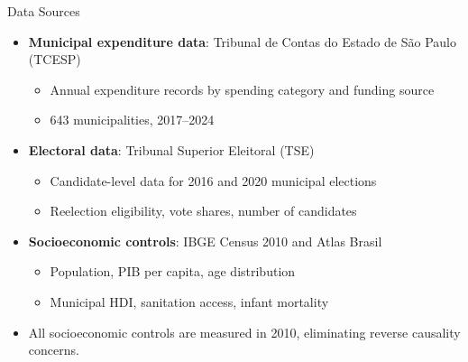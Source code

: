\documentclass{beamer}
\begin{document}
\begin{frame}{Data Sources}
\begin{itemize}
    \item \textbf{Municipal expenditure data}: Tribunal de Contas do Estado de São Paulo (TCESP)
    \begin{itemize}
        \item Annual expenditure records by spending category and funding source
        \item 643 municipalities, 2017--2024
    \end{itemize}
    \vspace{0.5em}
    \item \textbf{Electoral data}: Tribunal Superior Eleitoral (TSE)
    \begin{itemize}
        \item Candidate-level data for 2016 and 2020 municipal elections
        \item Reelection eligibility, vote shares, number of candidates
    \end{itemize}
    \vspace{0.5em}
    \item \textbf{Socioeconomic controls}: IBGE Census 2010 and Atlas Brasil
    \begin{itemize}
        \item Population, PIB per capita, age distribution
        \item Municipal HDI, sanitation access, infant mortality
    \end{itemize}
    \item All socioeconomic controls are measured in 2010, eliminating reverse causality concerns.
\end{itemize}
\end{frame}
\end{document}
